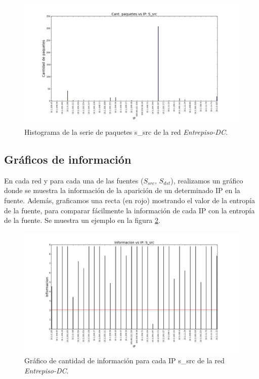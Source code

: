   \begin{figure}[H]
  \begin{center}
    \includegraphics[width=0.8\linewidth]{../imgs/red-entrepiso-dc_S_src_hist.png}
    \caption{Histograma de la serie de paquetes s\_src de la red \emph{Entrepiso-DC}.}
    \label{fig:histograma-entrepiso-dc-s-src-ejemplo}
  \end{center}
  \end{figure}
  
\subsection{Gráficos de información}

  En cada red y para cada una de las fuentes ($S_{src}$, $S_{dst}$), realizamos un gráfico donde se muestra la información de la aparición de un determinado IP en la fuente. Además, graficamos una recta (en rojo) mostrando el valor de la entropía de la fuente, para comparar fácilmente la información de cada IP con la entropía de la fuente. Se muestra un ejemplo en la figura \ref{fig:informacion-entrepiso-dc-s-src-ejemplo}.
  
  \begin{figure}[H]  
  \begin{center}
    \includegraphics[width=0.8\linewidth]{../imgs/red-entrepiso-dc_S_src_info.png}
    \caption{Gráfico de cantidad de información para cada IP s\_src de la red \emph{Entrepiso-DC}.}
    \label{fig:informacion-entrepiso-dc-s-src-ejemplo}
  \end{center}
\end{figure}